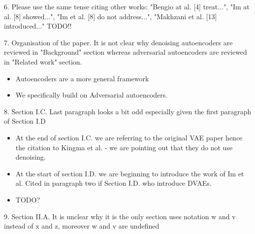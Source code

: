 \documentclass{article}
\begin{document}
{\color{blue}
6. Please use the same tense citing other works: "Bengio at al. [4] treat...", "Im at al. [8] showed...", "Im et al. [8] do not address...", "Makhzani et al. [13] introduced..."}
TODO!!

{\color{blue}
7. Organisation of the paper. It is not clear why denoising autoencoders are reviewed in "Background" section whereas adversarial autoencoders are reviewed in "Related work" section.}

\begin{itemize}
    \item Autoencoders are a more general framework
    \item We specifically build on Adversarial autoencoders.
\end{itemize}

{\color{blue}
8. Section I.C. Last paragraph looks a bit odd especially given the first paragraph of Section I.D}

\begin{itemize}
    \item At the end of section I.C. we are referring to the original VAE paper hence the citation to Kingma et al. - we are pointing out that they do not use denoising.
    \item At the start of section I.D. we are beginning to introduce the work of Im et al. Cited in paragraph two if Section I.D. who introduce DVAEs.
    \item TODO?
\end{itemize}

{\color{blue}
9. Section II.A. It is unclear why it is the only section uses notation w and v instead of x and z, moreover w and v are undefined}
\end{document}
